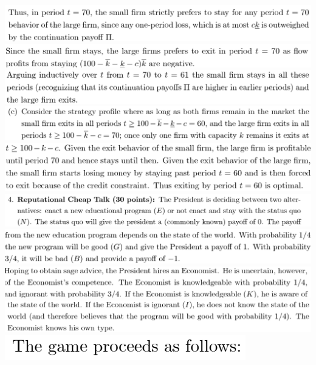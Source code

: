 \documentclass[8pt,landscape]{extarticle}
\begin{document}
\begin{multicols*}{3}
    \includegraphics[width=0.71\linewidth,keepaspectratio]{Screenshots/Screenshot 2024-03-11 170716.png}
    \includegraphics[width=0.71\linewidth,keepaspectratio]{Screenshots/Screenshot 2024-03-11 170720.png}
    \includegraphics[width=0.71\linewidth,keepaspectratio]{Screenshots/Screenshot 2024-03-11 170724.png}
    \includegraphics[width=0.74\linewidth,keepaspectratio]{Screenshots/Screenshot 2024-03-11 170734.png}
    \includegraphics[width=0.7\linewidth,keepaspectratio]{Screenshots/Screenshot 2024-03-11 170738.png}
    \includegraphics[width=0.8\linewidth,keepaspectratio]{Screenshots/Screenshot 2024-03-11 170755.png}
    \includegraphics[width=0.74\linewidth,keepaspectratio]{Screenshots/Screenshot 2024-03-11 170800.png}
    \includegraphics[width=0.75\linewidth,keepaspectratio]{Screenshots/Screenshot 2024-03-11 170804.png}
    \includegraphics[width=0.75\linewidth,keepaspectratio]{Screenshots/Screenshot 2024-03-11 170809.png}
    \includegraphics[width=0.26\linewidth,keepaspectratio]{Screenshots/Screenshot 2024-03-11 170815.png}

\end{multicols*}
\end{document}
